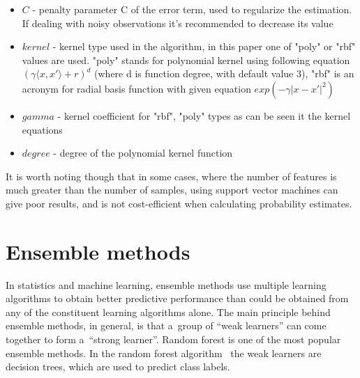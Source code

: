 \begin{itemize}
	\item $C$ - penalty parameter C of the error term, used to regularize the estimation. If dealing with noisy observations it's recommended to decrease its value
	\item $kernel$ - kernel type used in the algorithm, in this paper one of "poly" or "rbf" values are used. "poly" stands for polynomial kernel using following equation $(\gamma \langle x, x' \rangle + r)^{d}$ (where d is function degree, with default value 3), "rbf" is an acronym for radial basis function with given equation $exp(-\gamma|x - x'|^{2})$
	\item $gamma$ - kernel coefficient for "rbf", "poly" types as can be seen it the kernel equations
	\item $degree$ - degree of the polynomial kernel function
\end{itemize}

It is worth noting though that in some cases, where the number of features is much greater than the number of samples, using support vector machines can give poor results, and is not cost-efficient when calculating probability estimates. 

\section{Ensemble methods}

In statistics and machine learning, ensemble methods use multiple learning algorithms to obtain better predictive performance than could be obtained from any of the constituent learning algorithms alone. The main principle behind ensemble methods, in general, is that a~group of ``weak learners'' can come together to form a~``strong learner''\cite{EnsembleMethods}. Random forest is one of the most popular ensemble methods. In the random forest algorithm~\cite{Breiman2001} the weak learners are decision trees, which are used to predict class labels. 

